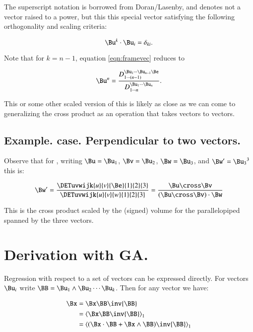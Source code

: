 \documentclass{article}      %
\newcommand{\gpgradeone}[1] {{\left\langle{{#1}}\right\rangle}_{1}}
\begin{document}
The superscript notation is borrowed from Doran/Lasenby, and denotes not a vector raised to a power, but this
this special vector satisfying the following orthogonality and scaling criteria:

\begin{equation}\label{eqn:reciportho}
\Bu^k \cdot \Bu_i = \delta_{ki}.
\end{equation}

Note that for $k=n-1$, equation \ref{eqn:framevec} reduces to

\begin{equation} \label{eqn:framevecnminus}
\Bu^n =
\frac{ D_{1 \cdots (n-1)}^{\Bu_1 \cdots \Bu_{n-1} \Be} } { D_{1 \cdots n}^{\Bu_1 \cdots \Bu_n} }.
\end{equation}

This or some other scaled version of this is likely as close as we can come to generalizing the cross product
as an operation that takes vectors to vectors.

\subsection{ Example.   case.  Perpendicular to two vectors. }

Observe that for , writing $\Bu = \Bu_1$, $\Bv = \Bu_2$, $\Bw = \Bu_3$, and $\Bw' = {\Bu_3}^3$ this is:

\begin{equation}
\Bw' = 
\frac{\DETuvwijk{u}{v}{\Be}{1}{2}{3}}{\DETuvwijk{u}{v}{w}{1}{2}{3}}
= 
\frac{\Bu \cross \Bv}{(\Bu \cross \Bv) \cdot \Bw}
\end{equation}

This is the cross product scaled by the (signed) volume for the parallelopiped spanned by the three vectors.

\section{ Derivation with GA. }

Regression with respect to a set of vectors can be expressed directly.  For vectors ${\Bu_i}$ write $\BB = \Bu_1 \wedge \Bu_2 \cdots \Bu_k$.  Then for any vector we have:

\begin{align*}
\Bx 
&= \Bx \BB \inv{\BB}  \\
&= \gpgradeone{ \Bx \BB \inv{\BB} } \\
&= \gpgradeone{ (\Bx \cdot \BB + \Bx \wedge \BB) \inv{\BB} }
\end{align*}
\end{document}
